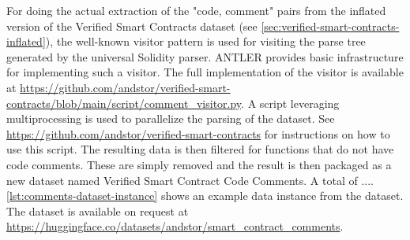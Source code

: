 For doing the actual extraction of the "code, comment" pairs from the inflated version of the Verified Smart Contracts dataset (see \cref{sec:verified-smart-contracts-inflated}), the well-known visitor pattern \cite{visitor-pattern} is used for visiting the parse tree generated by the universal Solidity parser. ANTLER provides basic infrastructure for implementing such a visitor. The full implementation of the visitor is available at \url{https://github.com/andstor/verified-smart-contracts/blob/main/script/comment_visitor.py}. A script leveraging multiprocessing is used to parallelize the parsing of the dataset. See \url{https://github.com/andstor/verified-smart-contracts} for instructions on how to use this script. The resulting data is then filtered for functions that do not have code comments. These are simply removed and the result is then packaged as a new dataset named Verified Smart Contract Code Comments. A total of .... \cref{lst:comments-dataset-instance} shows an example data instance from the dataset. The dataset is available on request at \url{https://huggingface.co/datasets/andstor/smart_contract_comments}. 



